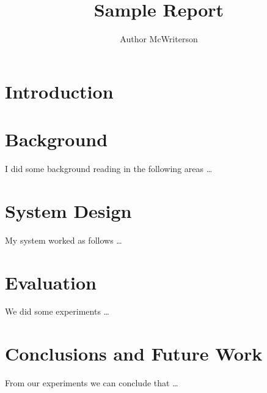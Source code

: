 \documentclass[a4paper, 11pt]{article}
\title{Sample Report}
\author{Author McWriterson}
\begin{document}
\maketitle
\tableofcontents

\section{Introduction}

\pagebreak

\section{Background}
I did some background reading\cite{BOOK_Russell} in the following areas \ldots
\pagebreak

\section{System Design}
My system worked as follows \ldots
\pagebreak

\section{Evaluation}
We did some experiments \ldots
\pagebreak

\section{Conclusions and Future Work}
From our experiments we can conclude that \ldots
\pagebreak

% 
% 


\end{document}
